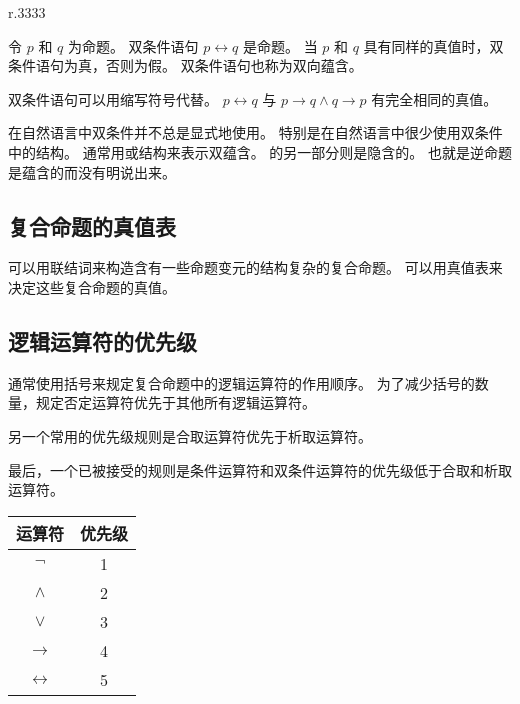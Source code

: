 {{\begin{wraptable}{r}{.3333\textwidth{}}
            \caption{双条件语句 $p \leftrightarrow q$ 的真值表}
        \end{wraptable}

        \begin{defines}
            令 $p$ 和 $q$ 为命题。
            双条件语句 $p \leftrightarrow q$ 是命题。
            当 $p$ 和 $q$ 具有同样的真值时，双条件语句为真，否则为假。
            双条件语句也称为双向蕴含。
        \end{defines}

        双条件语句可以用缩写符号代替。
        $p \leftrightarrow q$ 与 $p \rightarrow q \wedge q \rightarrow p$ 有完全相同的真值。

        {
            在自然语言中双条件并不总是显式地使用。
            特别是在自然语言中很少使用双条件中的结构。
            通常用或结构来表示双蕴含。
            的另一部分则是隐含的。
            也就是逆命题是蕴含的而没有明说出来。
        }
    }

    \subsection{复合命题的真值表}
    {
        可以用联结词来构造含有一些命题变元的结构复杂的复合命题。
        可以用真值表来决定这些复合命题的真值。
    }

    \subsection{逻辑运算符的优先级}
    {
        通常使用括号来规定复合命题中的逻辑运算符的作用顺序。
        为了减少括号的数量，规定否定运算符优先于其他所有逻辑运算符。

        另一个常用的优先级规则是合取运算符优先于析取运算符。

        最后，一个已被接受的规则是条件运算符和双条件运算符的优先级低于合取和析取运算符。

        \begin{table}[htb]
            \centering

            \begin{tabular}{c|c}
                \hline
                运算符 & 优先级 \\
                \hline
                $\neg$ & 1 \\
                \hline
                $\wedge$ & 2 \\
                $\vee$ & 3 \\
                \hline
                $\rightarrow$ & 4 \\
                $\leftrightarrow$ & 5 \\
                \hline
            \end{tabular}


\end{table}}}
